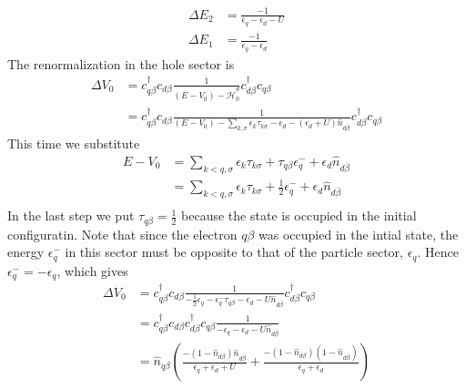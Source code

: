 \documentclass[twoside,11pt]{report}
\numberwithin{equation}{section}
\begin{document}
\begin{equation}\begin{aligned}
\Delta E_2 &= \frac{-1}{\epsilon_q - \epsilon_d - U}\\
\Delta E_1 &= \frac{-1}{\epsilon_q - \epsilon_d}
\end{aligned}\end{equation}
The renormalization in the hole sector is
\begin{equation}\begin{aligned}
	\Delta V_0 &=  c^\dagger_{q\beta}c_{d\beta}\frac{1}{\left(E - V_0\right) - \hat {\mathcal{H}}^d_0}c^\dagger_{d\beta}c_{q\beta}\\
		   &=  c^\dagger_{q\beta}c_{d\beta}\frac{1}{\left(E - V_0\right) - \sum_{k,\sigma}\epsilon_k\tau_{k\sigma} - \epsilon_d - \left(\epsilon_d + U\right)\hat n_{d\overline\beta}}c^\dagger_{d\beta}c_{q\beta}
\end{aligned}\end{equation}
This time we substitute
\begin{equation}\begin{aligned}
E - V_0 &= \sum_{k<q,\sigma}\epsilon_k \tau_{k\sigma} + \tau_{q\beta} \epsilon^-_q + \epsilon_d\hat n_{d\overline\beta}\\
&= \sum_{k<q,\sigma}\epsilon_k \tau_{k\sigma} + \frac{1}{2} \epsilon^-_q + \epsilon_d\hat n_{d\overline\beta}\\
\end{aligned}\end{equation}
In the last step we put \(\tau_{q\beta}=\frac{1}{2}\) because the state is occupied in the initial configuratin. Note that since the electron \(q\beta\) was occupied in the intial state, the energy \(\epsilon^-_q\) in this sector must be opposite to that of the particle sector, \(\epsilon_q\). Hence \(\epsilon^-_q = -\epsilon_q\), which gives
\begin{equation}\begin{aligned}
\Delta V_0 & = c^\dagger_{q\beta}c_{d\beta}\frac{1}{-\frac{1}{2} \epsilon_q -\epsilon^-_q\tau_{q\beta} - \epsilon_d - U\hat n_{d\overline\beta}}c^\dagger_{d\beta}c_{q\beta}\\
& = c^\dagger_{q\beta}c_{d\beta}c^\dagger_{d\beta}c_{q\beta}\frac{1}{-\epsilon_q - \epsilon_d - U\hat n_{d\overline\beta}}\\
& = \hat n_{q\beta}\left(\frac{-\left(1 - \hat n_{d\beta}\right)\hat n_{d\overline\beta}}{\epsilon_q + \epsilon_d + U} + \frac{-\left(1 - \hat n_{d\beta}\right)\left(1 - \hat n_{d\overline\beta}\right)}{\epsilon_q + \epsilon_d}\right)\\
\end{aligned}\end{equation}
\end{document}
